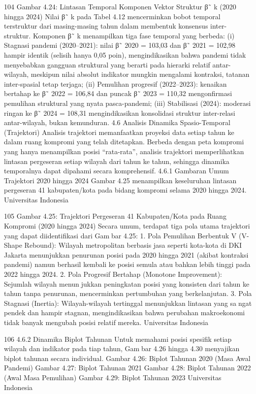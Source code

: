 104
Gambar 4.24: Lintasan Temporal Komponen Vektor Struktur β˜
k (2020 hingga 2024)
Nilai β˜
k pada Tabel 4.12 mencerminkan bobot temporal terstruktur dari masing-masing
tahun dalam membentuk konsensus inter-struktur. Komponen β˜
k menampilkan tiga fase
temporal yang berbeda: (i) Stagnasi pandemi (2020–2021): nilai β˜
2020 = 103,03 dan
β˜
2021 = 102,98 hampir identik (selisih hanya 0,05 poin), mengindikasikan bahwa pandemi
tidak menyebabkan gangguan struktural yang berarti pada hierarki relatif antar-wilayah,
meskipun nilai absolut indikator mungkin mengalami kontraksi, tatanan inter-spasial tetap
terjaga; (ii) Pemulihan progresif (2022–2023): kenaikan bertahap ke β˜
2022 = 106,84 dan
puncak β˜
2023 = 110,32 mengonfirmasi pemulihan struktural yang nyata pasca-pandemi;
(iii) Stabilisasi (2024): moderasi ringan ke β˜
2024 = 108,31 mengindikasikan konsolidasi
struktur inter-relasi antar-wilayah, bukan kemunduran.
4.6 Analisis Dinamika Spasio-Temporal (Trajektori)
Analisis trajektori memanfaatkan proyeksi data setiap tahun ke dalam ruang kompromi
yang telah ditetapkan. Berbeda dengan peta kompromi yang hanya menampilkan posisi
“rata-rata”, analisis trajektori memperlihatkan lintasan pergeseran setiap wilayah dari tahun
ke tahun, sehingga dinamika temporalnya dapat dipahami secara komprehensif.
4.6.1 Gambaran Umum Trajektori 2020 hingga 2024
Gambar 4.25 menampilkan keseluruhan lintasan pergeseran 41 kabupaten/kota pada
bidang kompromi selama 2020 hingga 2024.
Universitas Indonesia

105
Gambar 4.25: Trajektori Pergeseran 41 Kabupaten/Kota pada Ruang Kompromi (2020
hingga 2024)
Secara umum, terdapat tiga pola utama trajektori yang dapat diidentifikasi dari Gambar 4.25:
1. Pola Pemulihan Berbentuk V (V-Shape Rebound): Wilayah metropolitan berbasis
jasa seperti kota-kota di DKI Jakarta menunjukkan penurunan posisi pada 2020
hingga 2021 (akibat kontraksi pandemi) namun berhasil kembali ke posisi semula
atau bahkan lebih tinggi pada 2022 hingga 2024.
2. Pola Progresif Bertahap (Monotone Improvement): Sejumlah wilayah menunjukkan peningkatan posisi yang konsisten dari tahun ke tahun tanpa penurunan,
mencerminkan pertumbuhan yang berkelanjutan.
3. Pola Stagnasi (Inertia): Wilayah-wilayah tertinggal menunjukkan lintasan yang sangat pendek dan hampir stagnan, mengindikasikan bahwa perubahan makroekonomi
tidak banyak mengubah posisi relatif mereka.
Universitas Indonesia

106
4.6.2 Dinamika Biplot Tahunan
Untuk memahami posisi spesifik setiap wilayah dan indikator pada tiap tahun, Gambar 4.26 hingga 4.30 menyajikan biplot tahunan secara individual.
Gambar 4.26: Biplot Tahunan 2020 (Masa
Awal Pandemi) Gambar 4.27: Biplot Tahunan 2021
Gambar 4.28: Biplot Tahunan 2022 (Awal
Masa Pemulihan) Gambar 4.29: Biplot Tahunan 2023
Universitas Indonesia

